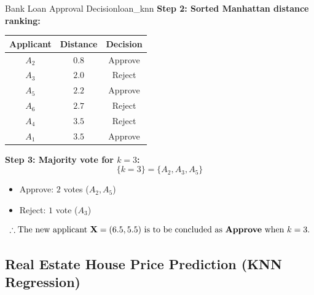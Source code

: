 \begin{example}{Bank Loan Approval Decision}{loan_knn}
\noindent\textbf{Step 2: Sorted Manhattan distance ranking:}
\begin{center}
\begin{tabular}{ccc}
\toprule
\textbf{Applicant} & \textbf{Distance} & \textbf{Decision} \\
\midrule
$A_2$ & $0.8$ & Approve \\
$A_3$ & $2.0$ & Reject \\
$A_5$ & $2.2$ & Approve \\
$A_6$ & $2.7$ & Reject \\
$A_4$ & $3.5$ & Reject \\
$A_1$ & $3.5$ & Approve \\
\bottomrule
\end{tabular}
\end{center}

\noindent\textbf{Step 3: Majority vote for $k = 3$:}
$$\{k = 3\} = \{A_2, A_3, A_5\}$$
\begin{itemize}[leftmargin=1.5em]
    \item Approve: $2$ votes ($A_2, A_5$)
    \item Reject: $1$ vote ($A_3$)
\end{itemize}
$$\therefore \text{The new applicant } \mathbf{X} = (6.5, 5.5) \text{ is to be concluded as } \textbf{Approve} \text{ when } k = 3.$$
\end{example}

\subsection{Real Estate House Price Prediction (KNN Regression)}


